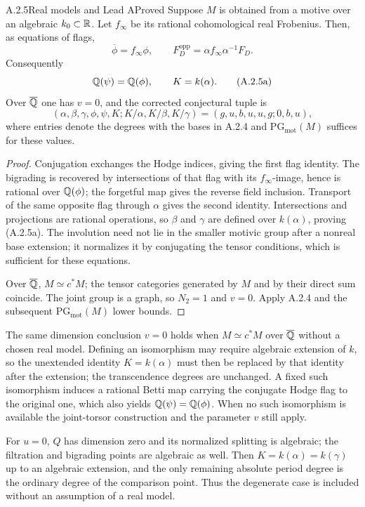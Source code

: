 \begin{result}{A.2.5}{Real models and Lead A}{Proved}
Suppose $M$ is obtained from a motive over an algebraic
$k_0\subset\mathbb R$. Let $f_\infty$ be its rational cohomological real
Frobenius. Then, as equations of flags,
\[
 \overline\phi=f_\infty\phi,\qquad
 F_D^{\mathrm{opp}}=\alpha f_\infty\alpha^{-1}F_D.
\]
Consequently
\[
                     \mathbb Q(\psi)=\mathbb Q(\phi),\qquad K=k(\alpha).
 \tag{A.2.5a}
\]
Over $\overline{\mathbb Q}$ one has $v=0$, and the corrected conjectural tuple is
\[
 (\alpha,\beta,\gamma,\phi,\psi,K;K/\alpha,K/\beta,K/\gamma)
                 =(g,u,b,u,u,g;0,b,u),
 \tag{A.2.5b}
\]
where entries denote the degrees with the bases in A.2.4 and
$\mathrm{PG}_{\mathrm{mot}}(M)$ suffices for these values.
\end{result}

\begin{proof}
Conjugation exchanges the Hodge indices, giving the first flag
identity. The bigrading is recovered by intersections of that flag
with its $f_\infty$-image, hence is rational over $\mathbb Q(\phi)$;
the forgetful map gives the reverse field inclusion. Transport of
the same opposite flag through $\alpha$ gives the second identity.
Intersections and projections are rational operations, so $\beta$
and $\gamma$ are defined over $k(\alpha)$, proving (A.2.5a).
The involution need not lie in the smaller motivic group after a
nonreal base extension; it normalizes it by conjugating the tensor
conditions, which is sufficient for these equations.

Over $\overline{\mathbb Q}$, $M\simeq c^*M$; the tensor categories generated by
$M$ and by their direct sum coincide. The joint group is a graph,
so $N_2=1$ and $v=0$. Apply A.2.4 and the subsequent
$\mathrm{PG}_{\mathrm{mot}}(M)$ lower bounds.
\end{proof}

The same dimension conclusion $v=0$ holds when $M\simeq c^*M$
over $\overline{\mathbb Q}$ without a chosen real model. Defining an isomorphism may
require algebraic extension of $k$, so the unextended identity
$K=k(\alpha)$ must then be replaced by that identity after the
extension; the transcendence degrees are unchanged. A fixed such
isomorphism induces a rational Betti map carrying the conjugate
Hodge flag to the original one, which also yields
$\mathbb Q(\psi)=\mathbb Q(\phi)$. When no such isomorphism is available the
joint-torsor construction and the parameter $v$ still apply.

For $u=0$, $Q$ has dimension zero and its normalized splitting is
algebraic; the filtration and bigrading points are algebraic as
well. Then $K=k(\alpha)=k(\gamma)$ up to an algebraic extension,
and the only remaining absolute period degree is the ordinary
degree of the comparison point. Thus the degenerate case is
included without an assumption of a real model.

